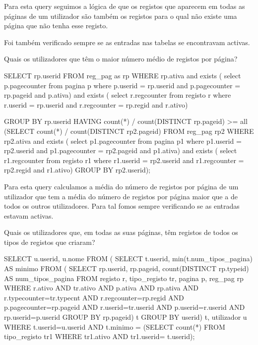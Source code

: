 \documentclass[11pt,a4paper]{article}
\begin{document}
\begin{enumerate}[label=(\alph*)]
\begin{minipage}{\textwidth}
Para esta query seguimos a lógica de que os registos que aparecem em todas as páginas de um utilizador são também os registos para o qual não existe uma página que não tenha esse registo. 

Foi também verificado sempre se as entradas nas tabelas se encontravam activas.
\end{minipage}	

\begin{minipage}{\textwidth}
	\item Quais os utilizadores que têm o maior número médio de registos por página?
	
		\begin{code}[language=SQL]
SELECT rp.userid
FROM reg_pag as rp
WHERE rp.ativa and 
	exists (
		select p.pagecounter 
		from pagina p
		where 	p.userid = rp.userid and
			p.pagecounter = rp.pageid and
			p.ativa) and
	exists (
		select r.regcounter
		from registo r
		where	r.userid = rp.userid and
			r.regcounter = rp.regid and
			r.ativo)
			
GROUP BY rp.userid
HAVING count(*) / count(DISTINCT rp.pageid) >= all
    (SELECT count(*) / count(DISTINCT rp2.pageid)
     FROM reg_pag rp2
     WHERE rp2.ativa and 
		exists (
			select p1.pagecounter 
			from pagina p1
			where 	p1.userid = rp2.userid and
				p1.pagecounter = rp2.pageid and
				p1.ativa) and
		exists (
			select r1.regcounter
			from registo r1
			where	r1.userid = rp2.userid and
				r1.regcounter = rp2.regid and
				r1.ativo)
	     GROUP BY rp2.userid);
		\end{code}
		
Para esta query calculamos a média do número de registos por página de um utilizador que tem a média do número de registos por página maior que a de todos os outros utilizadores. Para tal fomos sempre verificando se as entradas estavam activas.

 
\end{minipage}
\begin{minipage}{\textwidth}
	\item Quais os utilizadores que, em todas as suas páginas, têm registos de todos os tipos de registos que criaram?
	
\begin{code}[language=SQL]
SELECT u.userid,
       u.nome
FROM
  ( SELECT t.userid,
           min(t.num_tipos_pagina) AS minimo
   FROM
     ( SELECT rp.userid,
              rp.pageid,
              count(DISTINCT rp.typeid) AS num_tipos_pagina
      FROM registo r,
           tipo_registo tr,
           pagina p,
           reg_pag rp
      WHERE r.ativo
        AND tr.ativo AND p.ativa AND rp.ativa
        AND r.typecounter=tr.typecnt
        AND r.regcounter=rp.regid
        AND p.pagecounter=rp.pageid
        AND r.userid=tr.userid
        AND p.userid=r.userid
        AND rp.userid=p.userid
      GROUP BY rp.pageid) t
   GROUP BY userid) t,
     utilizador u
WHERE t.userid=u.userid
  AND t.minimo =
    (SELECT count(*)
     FROM tipo_registo tr1
     WHERE tr1.ativo
       AND tr1.userid= t.userid);
\end{code}


\end{minipage}
\end{enumerate}
\end{document}
